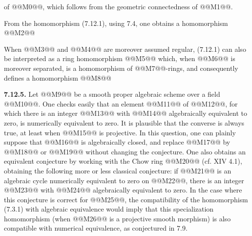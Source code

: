 
of @@M0@@, which follows from the geometric connectedness of @@M1@@.

From the homomorphism (7.12.1), using 7.4, one obtains a homomorphism
@@M2@@

When @@M3@@ and @@M4@@ are moreover assumed regular, (7.12.1) can also be interpreted as a ring homomorphism
@@M5@@
which, when @@M6@@ is moreover separated, is a homomorphism of @@M7@@-rings, and consequently defines a homomorphism
@@M8@@

\textbf{7.12.5.} Let @@M9@@ be a smooth proper algebraic scheme over a field @@M10@@. One checks easily that an element @@M11@@ of @@M12@@, for which there is an integer @@M13@@ with @@M14@@ algebraically equivalent to zero, is numerically equivalent to zero. It is plausible that the converse is always true, at least when @@M15@@ is projective. In this question, one can plainly suppose that @@M16@@ is algebraically closed, and replace @@M17@@ by @@M18@@ or @@M19@@ without changing the conjecture. One also obtains an equivalent conjecture by working with the Chow ring @@M20@@ (cf. XIV 4.1), obtaining the following more or less classical conjecture: if @@M21@@ is an algebraic cycle numerically equivalent to zero on @@M22@@, there is an integer @@M23@@ with @@M24@@ algebraically equivalent to zero. In the case where this conjecture is correct for @@M25@@, the compatibility of the homomorphism (7.3.1) with algebraic equivalence would imply that this specialization homomorphism (when @@M26@@ is a projective smooth morphism) is also compatible with numerical equivalence, as conjectured in 7.9.

